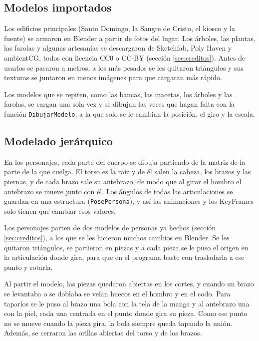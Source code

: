 \documentclass[11pt,a4paper]{article}
\begin{document}
\subsection{Modelos importados}

Los edificios principales (Santo Domingo, la Sangre de Cristo, el kiosco y la fuente) se armaron en Blender a partir de fotos del lugar. Los árboles, las plantas, las farolas y algunas artesanías se descargaron de Sketchfab, Poly Haven y ambientCG, todos con licencia CC0 o CC-BY (sección \ref{sec:creditos}). Antes de usarlos se pasaron a metros, a los más pesados se les quitaron triángulos y sus texturas se juntaron en menos imágenes para que cargaran más rápido.

Los modelos que se repiten, como las bancas, las macetas, los árboles y las farolas, se cargan una sola vez y se dibujan las veces que hagan falta con la función \texttt{DibujarModelo}, a la que solo se le cambian la posición, el giro y la escala.

\subsection{Modelado jerárquico}

En los personajes, cada parte del cuerpo se dibuja partiendo de la matriz de la parte de la que cuelga. El torso es la raíz y de él salen la cabeza, los brazos y las piernas, y de cada brazo sale su antebrazo, de modo que al girar el hombro el antebrazo se mueve junto con él. Los ángulos de todas las articulaciones se guardan en una estructura (\texttt{PosePersona}), y así las animaciones y los KeyFrames solo tienen que cambiar esos valores.

Los personajes parten de dos modelos de personas ya hechos (sección \ref{sec:creditos}), a los que se les hicieron muchos cambios en Blender. Se les quitaron triángulos, se partieron en piezas y a cada pieza se le puso el origen en la articulación donde gira, para que en el programa baste con trasladarla a ese punto y rotarla.

Al partir el modelo, las piezas quedaron abiertas en los cortes, y cuando un brazo se levantaba o se doblaba se veían huecos en el hombro y en el codo. Para taparlos se le puso al brazo una bola con la tela de la manga y al antebrazo una con la piel, cada una centrada en el punto donde gira su pieza. Como ese punto no se mueve cuando la pieza gira, la bola siempre queda tapando la unión. Además, se cerraron las orillas abiertas del torso y de los brazos.
\end{document}
